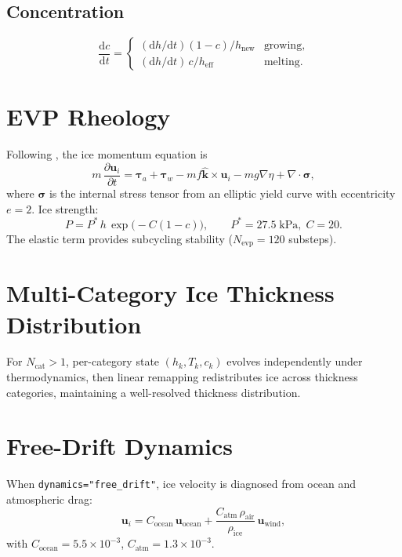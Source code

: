 \documentclass[11pt,twoside]{report}
\newcommand{\dd}{\mathrm{d}}
\newcommand{\pp}{\partial}
\newcommand{\vect}[1]{\bm{#1}}
\newcommand{\grad}{\nabla}
\newcommand{\divg}{\nabla\!\cdot\!}
\begin{document}
\subsection{Concentration}
\begin{equation}
  \frac{\dd c}{\dd t} = \begin{cases}
    (\dd h/\dd t)(1-c)/h_{\mathrm{new}} & \text{growing},\\
    (\dd h/\dd t)\,c/h_{\mathrm{eff}} & \text{melting}.
  \end{cases}
\end{equation}


\section{EVP Rheology}

Following \citet{HunkeDukowicz1997}, the ice momentum equation is
\begin{equation}
  m\,\frac{\pp\vect{u}_i}{\pp t} = \vect{\tau}_a + \vect{\tau}_w
  - mf\hat{\vect{k}}\times\vect{u}_i
  - mg\grad\eta + \divg\bm{\sigma},
\end{equation}
where $\bm{\sigma}$ is the internal stress tensor from an elliptic yield
curve with eccentricity $e=2$.  Ice strength:
\begin{equation}
  P = P^*\,h\,\exp\!\big(-C(1-c)\big),
  \qquad P^*=27.5\;\text{kPa},\; C=20.
\end{equation}
The elastic term provides subcycling stability ($N_{\mathrm{evp}}=120$
substeps).


\section{Multi-Category Ice Thickness Distribution}

For $N_{\mathrm{cat}}>1$, per-category state $(h_k,T_k,c_k)$ evolves
independently under thermodynamics, then \citet{Lipscomb2001} linear
remapping redistributes ice across thickness categories, maintaining a
well-resolved thickness distribution.


\section{Free-Drift Dynamics}

When \texttt{dynamics="free\_drift"}, ice velocity is diagnosed from ocean and atmospheric drag:
\begin{equation}
  \vect{u}_i = C_{\mathrm{ocean}}\,\vect{u}_{\mathrm{ocean}}
  + \frac{C_{\mathrm{atm}}\,\rho_{\mathrm{air}}}{\rho_{\mathrm{ice}}}\,\vect{u}_{\mathrm{wind}},
\end{equation}
with $C_{\mathrm{ocean}}=5.5\times10^{-3}$, $C_{\mathrm{atm}}=1.3\times10^{-3}$.
\end{document}
